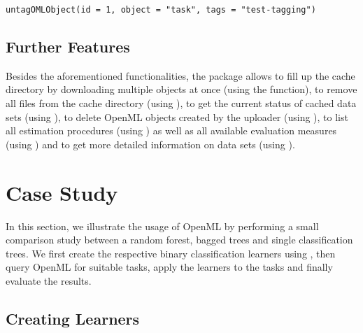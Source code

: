 \begin{knitrout}\small
{}\color{fgcolor}\begin{kframe}
\begin{verbatim}
untagOMLObject(id = 1, object = "task", tags = "test-tagging")
\end{verbatim}
\end{kframe}
\end{knitrout}

\subsection{Further Features}
Besides the aforementioned functionalities, the  package allows
to fill up the cache directory by downloading multiple objects at once (using the
 function), to remove all files from the cache directory 
(using ), to get the current status 
of cached data sets (using ), to delete OpenML 
objects created by the uploader (using ), to list all 
estimation procedures (using ) as well as all 
available evaluation measures (using ) and to get 
more detailed information on data sets (using ). 



\section{Case Study}
\label{sec:study}

In this section, we illustrate the usage of OpenML by performing a small
comparison study between a random forest, bagged trees and single classification trees. We first
create the respective binary classification learners using , then query
OpenML for suitable tasks, apply the learners to the tasks and finally evaluate
the results.

\subsection{Creating Learners}

